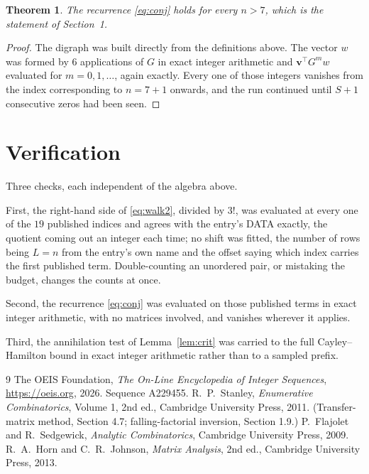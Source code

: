 \documentclass[11pt,a4paper]{article}
\theoremstyle{plain}
\newtheorem{theorem}{Theorem}
\theoremstyle{definition}
\begin{document}
\begin{theorem}
The recurrence \eqref{eq:conj} holds for every $n>7$, which is the statement of
Section~1.
\end{theorem}

\begin{proof}
The digraph was built directly from the definitions above. The vector $w$ was formed by
$6$ applications of $G$ in exact integer arithmetic and $\mathbf{v}^{\!\top}G^{m}w$
evaluated for $m=0,1,\dots$, again exactly. Every one of those integers vanishes from the
index corresponding to $n=7+1$ onwards, and the run continued until $S+1$ consecutive
zeros had been seen.
\end{proof}

\section{Verification}

Three checks, each independent of the algebra above.

First, the right-hand side of \eqref{eq:walk2}, divided by $3!$, was evaluated at every
one of the $19$ published indices and agrees with the entry's DATA exactly, the quotient
coming out an integer each time; no shift was fitted, the number of rows being $L=n$
from the entry's own name and the offset saying which index carries the first published term.
Double-counting an unordered pair, or mistaking the budget, changes the counts at once.

Second, the recurrence \eqref{eq:conj} was evaluated on those published terms in exact
integer arithmetic, with no matrices involved, and vanishes wherever it applies.

Third, the annihilation test of Lemma~\ref{lem:crit} was carried to the full
Cayley--Hamilton bound in exact integer arithmetic rather than to a sampled prefix.

\begin{thebibliography}{9}
 The OEIS Foundation, \emph{The On-Line Encyclopedia of Integer
Sequences}, \url{https://oeis.org}, 2026. Sequence A229455.
 R.~P.~Stanley, \emph{Enumerative Combinatorics}, Volume 1, 2nd ed.,
Cambridge University Press, 2011. (Transfer-matrix method, Section 4.7; falling-factorial
inversion, Section 1.9.)
 P.~Flajolet and R.~Sedgewick, \emph{Analytic Combinatorics}, Cambridge
University Press, 2009.
 R.~A.~Horn and C.~R.~Johnson, \emph{Matrix Analysis}, 2nd ed., Cambridge
University Press, 2013.
\end{thebibliography}
\end{document}
